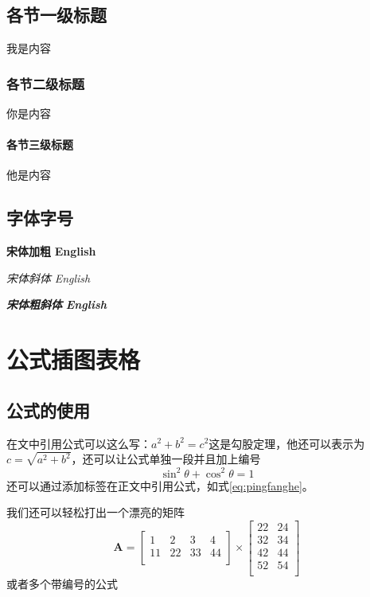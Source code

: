 \documentclass[]{WHUBachelor}
\begin{document}
  \section{各节一级标题}
  我是内容
  \subsection{各节二级标题}
  你是内容
  \subsubsection{各节三级标题}
  他是内容
  \section{字体字号}
  {\songti \bfseries 宋体加粗} {\textbf{English}}

  {\songti \itshape 宋体斜体} {\textit{English}}

  {\songti \bfseries \itshape 宋体粗斜体} {\textbf{\textit{English}}}
  
  \chapter{公式插图表格}
  \section{公式的使用}
  在文中引用公式可以这么写：$a^2+b^2=c^2$这是勾股定理，他还可以表示为$c=\sqrt{a^2+b^2}$，还可以让公式单独一段并且加上编号
  \begin{equation}
  \sin^2{\theta}+\cos^2{\theta}=1 \label{eq:pingfanghe}
  \end{equation}
  还可以通过添加标签在正文中引用公式，如式\eqref{eq:pingfanghe}。

  我们还可以轻松打出一个漂亮的矩阵
  \begin{equation}
    \mathbf{A}=
    \left[\begin{matrix}
      1&2&3&4\\
      11&22&33&44\\
    \end{matrix}\right] \times
    \left[\begin{matrix}
      22&24\\
      32&34\\
      42&44\\
      52&54\\
    \end{matrix}\right]
  \end{equation}
  或者多个带编号的公式
\end{document}
